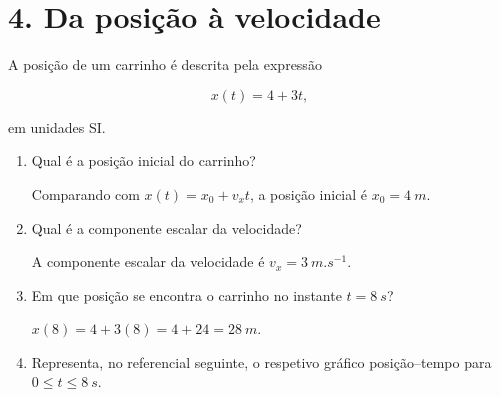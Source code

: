 \documentclass[11pt,a4paper]{article}
\begin{document}
	\section*{4. Da posição à velocidade}
	
	A posição de um carrinho é descrita pela expressão
	
	\[
	x(t)=4+3t,
	\]
	
	em unidades SI.
	
	\begin{enumerate}[label=\textbf{\arabic*.},resume]
		
		\item Qual é a posição inicial do carrinho?
		
		\begin{solucao}
			Comparando com $x(t) = x_0 + v_x t$, a posição inicial é $x_0 = \SI{4}{m}$.
		\end{solucao}
		
		\item Qual é a componente escalar da velocidade?
		
		\begin{solucao}
			A componente escalar da velocidade é $v_x = \SI{3}{m.s^{-1}}$.
		\end{solucao}
		
		\item Em que posição se encontra o carrinho no instante
		$t=\SI{8}{s}$?
		
		\begin{solucao}
			$x(8) = 4 + 3(8) = 4 + 24 = \SI{28}{m}$.
		\end{solucao}
		
		\item Representa, no referencial seguinte, o respetivo gráfico posição--tempo
		para $0\leq t\leq\SI{8}{s}$.
		
		\begin{solucao}
			\begin{center}
			\end{center}
		\end{solucao}
		

\end{enumerate}
\end{document}
